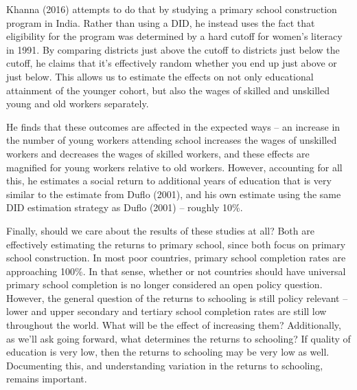 \documentclass[12pt,english]{article}
\begin{document}
Khanna (2016) attempts to do that by studying a primary school construction program in India. Rather than using a DID, he instead uses the fact that eligibility for the program was determined by a hard cutoff for women's literacy in 1991. By comparing districts just above the cutoff to districts just below the cutoff, he claims that it's effectively random whether you end up just above or just below. This allows us to estimate the effects on not only educational attainment of the younger cohort, but also the wages of skilled and unskilled young and old workers separately.

He finds that these outcomes are affected in the expected ways -- an increase in the number of young workers attending school increases the wages of unskilled workers and decreases the wages of skilled workers, and these effects are magnified for young workers relative to old workers. However, accounting for all this, he estimates a social return to additional years of education that is very similar to the estimate from Duflo (2001), and his own estimate using the same DID estimation strategy as Duflo (2001) -- roughly 10\%.

Finally, should we care about the results of these studies at all? Both are effectively estimating the returns to primary school, since both focus on primary school construction. In most poor countries, primary school completion rates are approaching 100\%. In that sense, whether or not countries should have universal primary school completion is no longer considered an open policy question. However, the general question of the returns to schooling is still policy relevant -- lower and upper secondary and tertiary school completion rates are still low throughout the world. What will be the effect of increasing them? Additionally, as we'll ask going forward, what determines the returns to schooling? If quality of education is very low, then the returns to schooling may be very low as well. Documenting this, and understanding variation in the returns to schooling, remains important.
\end{document}
